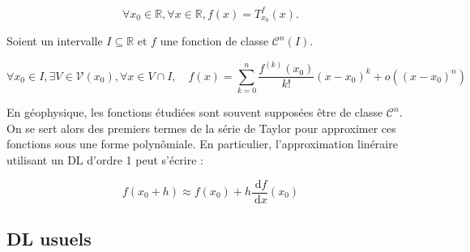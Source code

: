 $$
\forall x_0 \in \mathbb{R}, \forall x \in \mathbb{R}, f(x)=T_{x_0}^f(x) .
$$

Soient un intervalle $I \subseteq \mathbb{R}$ et $f$ une fonction de classe $\mathcal{C}^n(I)$.

$$
\forall x_0 \in I, \exists V \in \mathcal{V}\left(x_0\right), \forall x \in V \cap I, \quad f(x)=\sum_{k=0}^n \frac{f^{(k)}\left(x_0\right)}{k!}\left(x-x_0\right)^k+o\left(\left(x-x_0\right)^n\right)
$$


En géophysique, les fonctions étudiées sont souvent supposées être de classe $\mathcal{C}^n$. On se sert alors des premiers termes de la série de Taylor pour approximer ces fonctions sous une forme polynômiale. En particulier, l'approximation linéraire utilisant un DL d'ordre 1 peut s'écrire :

$$
f\left(x_0+h\right) \approx f\left(x_0\right)+h \frac{\mathrm{~d} f}{\mathrm{~d} x}\left(x_0\right)
$$

\subsection{DL usuels}

